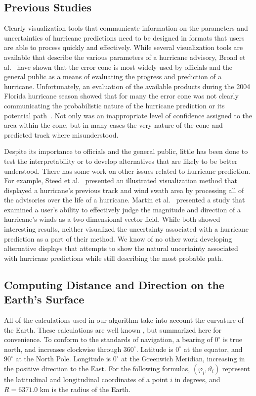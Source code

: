 \documentclass[journal]{vgtc}                %
\begin{document}
\subsection{Previous Studies}
Clearly visualization tools that communicate information on the parameters and uncertainties of hurricane predictions need to be designed in formats that users are able to process quickly and effectively.  While several visualization tools are available that describe the various parameters of a hurricane advisory, Broad et al.~\cite{Broad:007:MCOUF} have shown that the error cone is most widely used by officials and the general public as a means of evaluating the progress and prediction of a hurricane.  Unfortunately, an evaluation of the available products during the 2004 Florida hurricane season showed that for many the error cone was not clearly communicating the probabilistic nature of the hurricane prediction or its potential path~\cite{USACE:2004:ES}.  Not only was an inappropriate level of confidence assigned to the area within the cone, but in many cases the very nature of the cone and predicted track where misunderstood.

Despite its importance to officials and the general public, little has been done to test the interpretability or to develop alternatives that
are likely to be better understood. There has some work on other issues related to hurricane prediction. For example, Steed et al.~\cite{Steed:2009:HAI} presented an illustrated visualization method that displayed a hurricane's previous track and wind swath area by processing all of the advisories over the life of a hurricane.  Martin et al.~\cite{Martin:2008:HV2D} presented a study that examined a user's ability to effectively judge the magnitude and direction of a hurricane's winds as a two dimensional vector field. While both showed interesting results, neither visualized the uncertainty associated with a hurricane prediction as a part of their method.  We know of no other work developing alternative displays that attempts to show the natural uncertainty associated with hurricane predictions while still describing the most probable path.

\subsection{Computing Distance and Direction on the Earth's Surface}

All of the calculations used in our algorithm take into account the curvature of the Earth.  These calculations are well known \cite{Veness:2010:MVT}, but summarized here for convenience.  To conform to the standards of navigation, a bearing of $0^\circ$  is true north, and increases clockwise through $360^\circ$. Latitude is $0^\circ$ at the equator, and $90^\circ$ at the North Pole. Longitude is $0^\circ$ at the Greenwich Meridian, increasing in the positive direction to the East.
For the following formulas, $(\varphi_{i}, \vartheta_{i})$ represent the latitudinal and longitudinal coordinates of a 
point $i$ in degrees, and $R = 6371.0$ km is the radius of the Earth.
\end{document}
